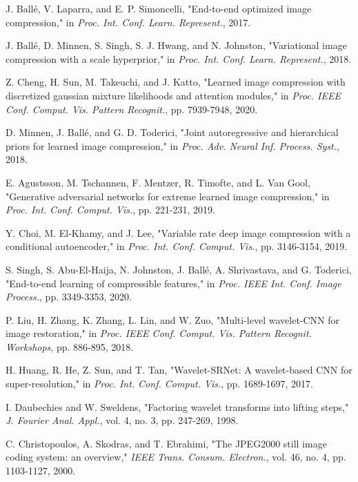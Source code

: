 \documentclass[conference]{IEEEtran}
\begin{document}
\begin{thebibliography}{00}

J. Ballé, V. Laparra, and E. P. Simoncelli, "End-to-end optimized image compression," in \textit{Proc. Int. Conf. Learn. Represent.}, 2017.

J. Ballé, D. Minnen, S. Singh, S. J. Hwang, and N. Johnston, "Variational image compression with a scale hyperprior," in \textit{Proc. Int. Conf. Learn. Represent.}, 2018.

Z. Cheng, H. Sun, M. Takeuchi, and J. Katto, "Learned image compression with discretized gaussian mixture likelihoods and attention modules," in \textit{Proc. IEEE Conf. Comput. Vis. Pattern Recognit.}, pp. 7939-7948, 2020.

D. Minnen, J. Ballé, and G. D. Toderici, "Joint autoregressive and hierarchical priors for learned image compression," in \textit{Proc. Adv. Neural Inf. Process. Syst.}, 2018.

E. Agustsson, M. Tschannen, F. Mentzer, R. Timofte, and L. Van Gool, "Generative adversarial networks for extreme learned image compression," in \textit{Proc. Int. Conf. Comput. Vis.}, pp. 221-231, 2019.

Y. Choi, M. El-Khamy, and J. Lee, "Variable rate deep image compression with a conditional autoencoder," in \textit{Proc. Int. Conf. Comput. Vis.}, pp. 3146-3154, 2019.

S. Singh, S. Abu-El-Haija, N. Johnston, J. Ballé, A. Shrivastava, and G. Toderici, "End-to-end learning of compressible features," in \textit{Proc. IEEE Int. Conf. Image Process.}, pp. 3349-3353, 2020.

P. Liu, H. Zhang, K. Zhang, L. Lin, and W. Zuo, "Multi-level wavelet-CNN for image restoration," in \textit{Proc. IEEE Conf. Comput. Vis. Pattern Recognit. Workshops}, pp. 886-895, 2018.

H. Huang, R. He, Z. Sun, and T. Tan, "Wavelet-SRNet: A wavelet-based CNN for super-resolution," in \textit{Proc. Int. Conf. Comput. Vis.}, pp. 1689-1697, 2017.

I. Daubechies and W. Sweldens, "Factoring wavelet transforms into lifting steps," \textit{J. Fourier Anal. Appl.}, vol. 4, no. 3, pp. 247-269, 1998.

C. Christopoulos, A. Skodras, and T. Ebrahimi, "The JPEG2000 still image coding system: an overview," \textit{IEEE Trans. Consum. Electron.}, vol. 46, no. 4, pp. 1103-1127, 2000.


\end{thebibliography}
\end{document}
